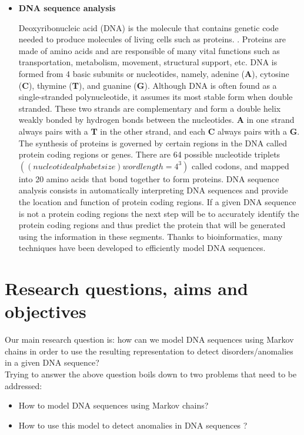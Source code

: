 \documentclass[10pt,twocolumn,letterpaper]{article}
\begin{document}
{\begin{itemize}
      \item \textbf{DNA sequence analysis}
      \par Deoxyribonucleic acid (DNA) is the molecule that contains genetic code needed to produce molecules of living cells such as
       proteins. \cite{krawetz2003introduction}. Proteins are made of amino acids and are responsible of many vital functions such as
        transportation, metabolism, movement, structural support, etc. DNA is formed from 4 basic subunits or nucleotides, namely, adenine
        (\textbf{A}), cytosine (\textbf{C}), thymine (\textbf{T}), and guanine (\textbf{G}). \cite{chakravarthy2004autoregressive} Although
         DNA is often found as a single-stranded polynucleotide, it assumes its most stable form when double stranded. These two strands are complementary
          and form a double helix weakly bonded by hydrogen bonds between the nucleotides. \textbf{A} in one strand always pairs with a \textbf{T} in
           the other strand, and each \textbf{C} always pairs with a \textbf{G}. The synthesis of proteins is governed by certain regions in the DNA called protein coding regions or genes.
            There are 64 possible nucleotide triplets $((nucleotide alphabet size)word length = 4^3 )$ called codons, and mapped into 20 amino acids
             that bond together to form proteins. DNA sequence analysis consists in automatically interpreting DNA sequences and provide the location and function of protein coding regions.
              If a given DNA sequence is not a protein coding regions the next step will be to accurately identify the protein coding regions and thus predict the protein that will be generated
               using the information in these segments. \cite{chakravarthy2004autoregressive} Thanks to bioinformatics, many techniques have been developed to efficiently model DNA sequences.
   \end{itemize}
 }
\section{Research questions, aims and objectives}
 {
    Our main research question is: how can we model DNA sequences using Markov chains in order 
    to use the resulting representation to detect disorders/anomalies in a given DNA sequence?\\
    Trying to answer the above question boils down to two problems that need to be addressed:
    \begin{itemize}
        \item How to model DNA sequences using Markov chains?
        \item How to use this model to detect anomalies in DNA sequences \cite{scientific_american}?
    \end{itemize}

 }
\end{document}
